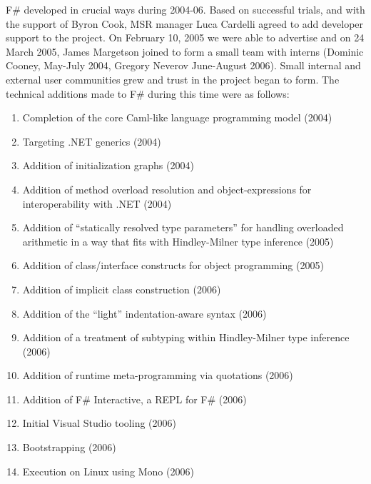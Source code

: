 \documentclass[acmsmall]{acmart}\settopmatter{}
\begin{document}
F\# developed in crucial ways during 2004-06.  Based on successful trials, and with the support of Byron Cook, MSR manager Luca Cardelli
agreed to add developer support to the project. On February 10, 2005 we were able to advertise and on 24 March 2005, James Margetson
joined to form a small team with interns (Dominic Cooney, May-July 2004, Gregory Neverov June-August 2006). Small internal and external
user communities grew and trust in the project began to form. The technical additions made to F\# during this time were as follows:

\begin{enumerate}
\item Completion of the core Caml-like language programming model (2004)
\item Targeting .NET generics (2004)
\item Addition of initialization graphs (2004)
\item Addition of method overload resolution and object-expressions for interoperability with .NET (2004)
\item Addition of “statically resolved type parameters” for handling overloaded arithmetic in a way that fits with Hindley-Milner type inference (2005)
\item Addition of class/interface constructs for object programming (2005)
\item Addition of implicit class construction (2006)
\item Addition of the “light” indentation-aware syntax (2006)
\item Addition of a treatment of subtyping within Hindley-Milner type inference (2006)
\item Addition of runtime meta-programming via quotations (2006)
\item Addition of F\# Interactive, a REPL for F\# (2006)
\item Initial Visual Studio tooling (2006)
\item Bootstrapping (2006)
\item Execution on Linux using Mono (2006)
\end{enumerate}
\end{document}
